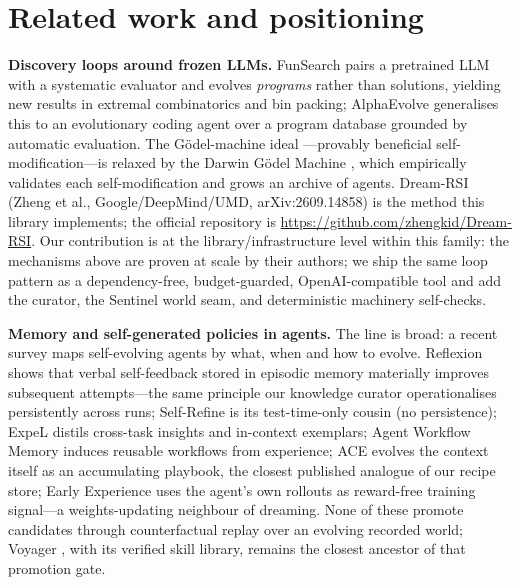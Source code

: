 \documentclass[11pt,a4paper]{article}
\newcommand{\hdr}[1]{\textbf{#1}}
\begin{document}
\section{Related work and positioning}
\label{sec:related}

\hdr{Discovery loops around frozen LLMs.} FunSearch \cite{funsearch} pairs a
pretrained LLM with a systematic evaluator and evolves \emph{programs} rather
than solutions, yielding new results in extremal combinatorics and bin
packing; AlphaEvolve \cite{alphaevolve} generalises this to an evolutionary
coding agent over a program database grounded by automatic evaluation. The
G\"odel-machine ideal \cite{godel}---provably beneficial self-modification---is
relaxed by the Darwin G\"odel Machine \cite{dgm}, which empirically validates
each self-modification and grows an archive of agents. Dream-RSI
\cite{dreamrsi} (Zheng et al., Google/DeepMind/UMD, arXiv:2609.14858) is the
method this library implements; the official repository is
\url{https://github.com/zhengkid/Dream-RSI}. Our contribution is at the
library/infrastructure level within this family: the mechanisms above are
proven at scale by their authors; we ship the same loop pattern as a
dependency-free, budget-guarded, OpenAI-compatible tool and add the curator,
the Sentinel world seam, and deterministic machinery self-checks.

\hdr{Memory and self-generated policies in agents.} The line is broad: a
recent survey \cite{selfevosurvey} maps self-evolving agents by what, when
and how to evolve. Reflexion \cite{reflexion} shows that verbal self-feedback
stored in episodic memory materially improves subsequent attempts---the same
principle our knowledge curator operationalises persistently across runs;
Self-Refine \cite{selfrefine} is its test-time-only cousin (no persistence);
ExpeL \cite{expel} distils cross-task insights and in-context exemplars;
Agent Workflow Memory \cite{awm} induces reusable workflows from experience;
ACE \cite{ace} evolves the context itself as an accumulating playbook, the
closest published analogue of our recipe store; Early Experience
\cite{earlyexp} uses the agent's own rollouts as reward-free training
signal---a weights-updating neighbour of dreaming. None of these promote
candidates through counterfactual replay over an evolving recorded world;
Voyager \cite{voyager}, with its verified skill library, remains the closest
ancestor of that promotion gate.
\end{document}
